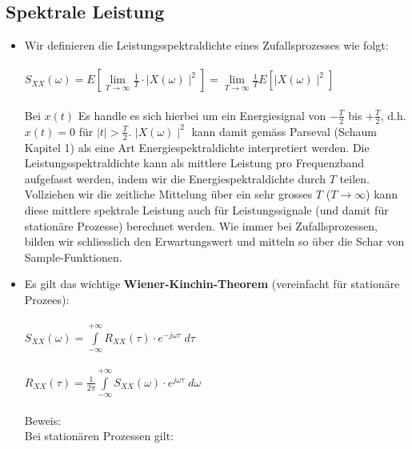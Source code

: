 \documentclass[10pt, a4paper]{article}
\begin{document}
\subsection{Spektrale Leistung}
\begin{itemize}
  \item Wir definieren die Leistungsspektraldichte eines Zufallsprozesses wie folgt: \\ \\
        $S_{XX}(\omega) = E\left[ \lim\limits_{T \rightarrow \infty}
                                    \frac{1}{T} \cdot \mid\! X(\omega) \!\mid^{2}\right]  
                        = \lim\limits_{T \rightarrow \infty}
                            \frac{1}{T} E\left[\mid\! X(\omega) \!\mid^{2} \right]$ \\ \\
        Bei $x(t)$ Es handle es sich hierbei um ein Energiesignal von $-\frac{T}{2}$ bis
        $+\frac{T}{2}$, d.h. $x(t) = 0$ f\"ur $\mid\! t \!\mid > \frac{T}{2}$.
        $\mid\!X(\omega)\!\mid^{2}$ kann damit gem\"ass Parseval (Schaum Kapitel 1) als
        eine Art Energiespektraldichte interpretiert werden.
        Die Leistungsspektraldichte
        kann als mittlere Leistung pro Frequenzband aufgefasst werden,
        indem wir die Energiespektraldichte
        durch $T$ teilen. Vollziehen wir die zeitliche
        Mittelung \"uber ein sehr grosses $T$ ($T \rightarrow \infty$)
        kann diese mittlere spektrale Leistung auch f\"ur
        Leistungssignale (und damit f\"ur station\"are Prozesse) berechnet werden. 
        Wie immer bei Zufallsprozessen, bilden wir schliesslich 
        den Erwartungswert und mitteln so \"uber die Schar von Sample-Funktionen.
  \item Es gilt das wichtige \textbf{Wiener-Kinchin-Theorem} (vereinfacht f\"ur station\"are Prozees): \\ \\
        $S_{XX}(\omega) = \int\limits_{-\infty}^{+\infty} 
                             R_{XX}(\tau) \cdot e^{-j\omega\tau} \; d\tau$ \\ \\
        $R_{XX}(\tau)   = \frac{1}{2\pi} \int\limits_{-\infty}^{+\infty} 
                             S_{XX}(\omega) \cdot e^{j\omega\tau} \; d\omega$ \\ \\
        Beweis: \\
        Bei station\"aren Prozessen gilt: \\ \\

\end{itemize}
\end{document}

